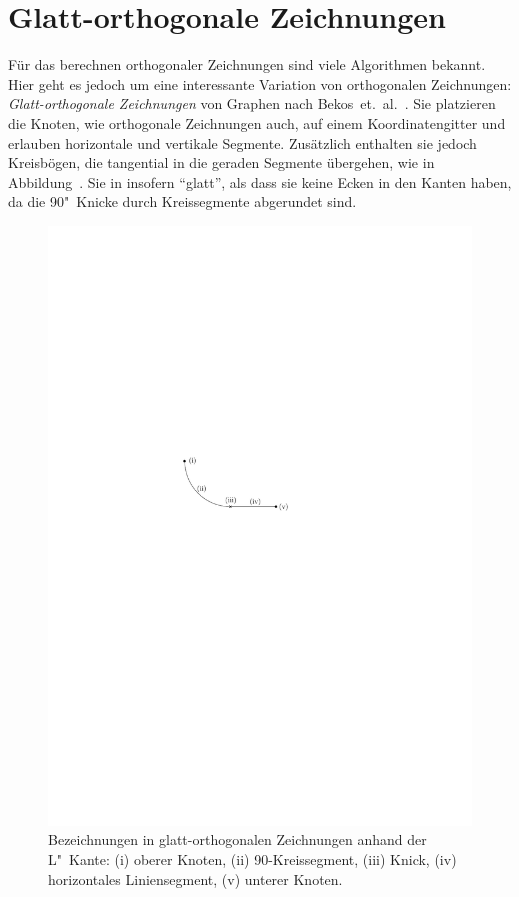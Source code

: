 \documentclass[a4paper]{scrreprt}
\theoremstyle{definition}
\begin{document}

\section{Glatt-orthogonale Zeichnungen}

Für das berechnen orthogonaler Zeichnungen sind viele Algorithmen bekannt. Hier geht es jedoch um eine interessante Variation von orthogonalen Zeichnungen: \emph{Glatt-orthogonale Zeichnungen} von Graphen nach Bekos~et.~al.~\cite{bekos-13}. Sie platzieren die Knoten, wie orthogonale Zeichnungen auch, auf einem Koordinatengitter und erlauben horizontale und vertikale Segmente. Zusätzlich enthalten sie jedoch Kreisbögen, die tangential in die geraden Segmente übergehen, wie in Abbildung~\label{ref:cutLslopecorrection}. Sie in insofern "`glatt"', als dass sie keine Ecken in den Kanten haben, da die 90\textdegree"~Knicke durch Kreissegmente abgerundet sind.

\begin{figure}[h]
  \centering
  \includegraphics{anatomieLKante}
  \caption{Bezeichnungen in glatt-orthogonalen Zeichnungen anhand der L"~Kante: (i) oberer Knoten, (ii) 90\textdegree-Kreissegment, (iii) Knick, (iv) horizontales Liniensegment, (v) unterer Knoten.}
  \label{fig:cutLslopecorrection}
\end{figure}
\end{document}
